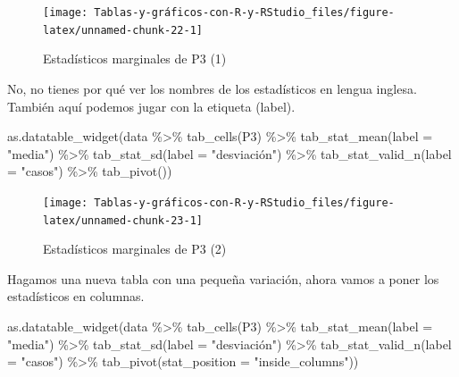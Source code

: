 \documentclass[
]{book}
\newenvironment{Shaded}{\begin{snugshade}}{\end{snugshade}}
\newcommand{\AttributeTok}[1]{\textcolor[rgb]{0.77,0.63,0.00}{#1}}
\newcommand{\FunctionTok}[1]{\textcolor[rgb]{0.00,0.00,0.00}{#1}}
\newcommand{\NormalTok}[1]{#1}
\newcommand{\SpecialCharTok}[1]{\textcolor[rgb]{0.00,0.00,0.00}{#1}}
\newcommand{\StringTok}[1]{\textcolor[rgb]{0.31,0.60,0.02}{#1}}
\begin{document}
\begin{figure}[H]

{\centering \texttt{[image: Tablas-y-gráficos-con-R-y-RStudio\_files/figure-latex/unnamed-chunk-22-1]} 

}

\caption{Estadísticos marginales de P3 (1)}\label{fig:unnamed-chunk-22}
\end{figure}

No, no tienes por qué ver los nombres de los estadísticos en lengua inglesa. También aquí podemos jugar con la etiqueta (label).

\begin{Shaded}
\begin{Highlighting}[]
\FunctionTok{as.datatable\_widget}\NormalTok{(data }\SpecialCharTok{\%\textgreater{}\%} \FunctionTok{tab\_cells}\NormalTok{(P3) }\SpecialCharTok{\%\textgreater{}\%} \FunctionTok{tab\_stat\_mean}\NormalTok{(}\AttributeTok{label =} \StringTok{"media"}\NormalTok{) }\SpecialCharTok{\%\textgreater{}\%} 
  \FunctionTok{tab\_stat\_sd}\NormalTok{(}\AttributeTok{label =} \StringTok{"desviación"}\NormalTok{) }\SpecialCharTok{\%\textgreater{}\%} \FunctionTok{tab\_stat\_valid\_n}\NormalTok{(}\AttributeTok{label =} \StringTok{"casos"}\NormalTok{) }\SpecialCharTok{\%\textgreater{}\%} 
  \FunctionTok{tab\_pivot}\NormalTok{())}
\end{Highlighting}
\end{Shaded}

\begin{figure}[H]

{\centering \texttt{[image: Tablas-y-gráficos-con-R-y-RStudio\_files/figure-latex/unnamed-chunk-23-1]} 

}

\caption{Estadísticos marginales de P3 (2)}\label{fig:unnamed-chunk-23}
\end{figure}

Hagamos una nueva tabla con una pequeña variación, ahora vamos a poner los estadísticos en columnas.

\begin{Shaded}
\begin{Highlighting}[]
\FunctionTok{as.datatable\_widget}\NormalTok{(data }\SpecialCharTok{\%\textgreater{}\%} \FunctionTok{tab\_cells}\NormalTok{(P3) }\SpecialCharTok{\%\textgreater{}\%} \FunctionTok{tab\_stat\_mean}\NormalTok{(}\AttributeTok{label =} \StringTok{"media"}\NormalTok{) }\SpecialCharTok{\%\textgreater{}\%} 
  \FunctionTok{tab\_stat\_sd}\NormalTok{(}\AttributeTok{label =} \StringTok{"desviación"}\NormalTok{) }\SpecialCharTok{\%\textgreater{}\%} \FunctionTok{tab\_stat\_valid\_n}\NormalTok{(}\AttributeTok{label =} \StringTok{"casos"}\NormalTok{) }\SpecialCharTok{\%\textgreater{}\%} 
  \FunctionTok{tab\_pivot}\NormalTok{(}\AttributeTok{stat\_position =} \StringTok{"inside\_columns"}\NormalTok{))}
\end{Highlighting}
\end{Shaded}
\end{document}
